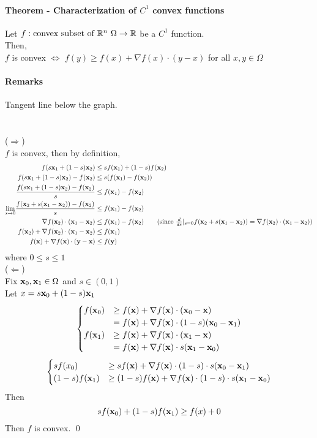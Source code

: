 \documentclass[11pt]{article}
\begin{document}
\paragraph{Theorem - Characterization of $C^1$ convex functions}
Let $f: \text{convex subset of $\mathbb{R}^n$ } \Omega \rightarrow \mathbb{R}$ be a $C^1$ function. \\
Then,\\
$f$ is convex $\iff$ $f(y) \geq f(x) + \nabla f(x)\cdot(y-x)$ 
for all $x,y \in \Omega$
\paragraph{Remarks}
Tangent line below the graph.\\\\
 \\
($\Rightarrow$) \\
$f$ is convex, then by definition,
\begin{align*}
f(s\vx_1 + (1-s)\vx_2) &\leq sf(\vx_1) + (1-s)f(\vx_2)\\
f(s\vx_1 + (1-s)\vx_2) - f(\vx_2) &\leq s(f(\vx_1) - f(\vx_2)) \\
\frac{f(s\vx_1 + (1-s)\vx_2) - f(\vx_2)}{s} &\leq f(\vx_1) - f(\vx_2) \\
\underset{s \rightarrow 0}{\lim} \frac{f(\vx_2 + s(\vx_1 - \vx_2)) - f(\vx_2)}{s} &\leq f(\vx_1) - f(\vx_2) \\
\nabla f(\vx_2)\cdot(\vx_1 - \vx_2) &\leq f(\vx_1) - f(\vx_2) \tag{since $\frac{d}{ds}|_{s=0} f(\vx_2 + s(\vx_1 - \vx_2)) = \nabla f(\vx_2) \cdot (\vx_1 - \vx_2)$}\\
f(\vx_2) + \nabla f(\vx_2)\cdot(\vx_1 - \vx_2) &\leq f(\vx_1)\\
f(\vx) + \nabla f(\vx) \cdot (\vy-\vx) &\leq f(\vy)
\end{align*}
where $0\leq s \leq 1$ \\
($\Leftarrow$)\\
Fix $\textbf{x}_0, \textbf{x}_1 \in \Omega$ and $s \in (0,1)$ \\
Let $x = s\textbf{x}_0 + (1-s)\textbf{x}_1$ \\
$$\begin{cases}
	f(\textbf{x}_0) &\geq f(\textbf{x}) + \nabla f(\textbf{x}) \cdot (\textbf{x}_0 - \textbf{x}) \\
	&= f(\textbf{x}) + \nabla f(\textbf{x}) \cdot (1-s)(\textbf{x}_0 - \textbf{x}_1) \\
	f(\textbf{x}_1) &\geq f(\textbf{x}) + \nabla f(\textbf{x}) \cdot (\textbf{x}_1 - \textbf{x}) \\
	&= f(\textbf{x}) + \nabla f(\textbf{x}) \cdot s(\textbf{x}_1 - \textbf{x}_0) \\
\end{cases}$$
	$$\begin{cases}sf(x_0) &\geq sf(\textbf{x}) + \nabla f(\textbf{x}) \cdot (1-s) \cdot s(\textbf{x}_0 - \textbf{x}_1) \\
	(1-s)f(\textbf{x}_1) &\geq (1-s)f(\textbf{x}) + \nabla f(\textbf{x}) \cdot (1-s)\cdot s(\textbf{x}_1 - \textbf{x}_0)  \end{cases}$$
Then
$$sf(\textbf{x}_0) + (1-s)f(\textbf{x}_1) \geq f(x) + 0$$
Then $f$ is convex.
\qed
\end{document}
